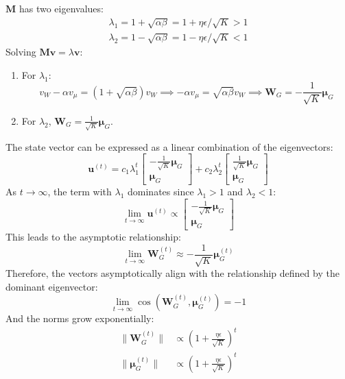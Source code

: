 \documentclass{article}
\theoremstyle{plain}
\theoremstyle{definition}
\theoremstyle{remark}
\begin{document}
$\mathbf{M}$ has two eigenvalues:
\begin{align}
    \lambda_1 = 1 + \sqrt{\alpha \beta} = 1 + \eta \epsilon / \sqrt{K} > 1\\
    \lambda_2 = 1 - \sqrt{\alpha \beta} = 1 - \eta \epsilon / \sqrt{K} < 1
\end{align}
Solving $\mathbf{M} \bm{v} = \lambda \bm{v}$:
\begin{enumerate}
    \item For $\lambda_1$:
    \begin{equation}
        v_W - \alpha v_\mu = (1 + \sqrt{\alpha\beta}) v_W \implies -\alpha v_\mu = \sqrt{\alpha\beta} v_W \implies \bm{W}_G = -\frac{1}{\sqrt{K}} \bm{\mu}_G
    \end{equation}
    \item For $\lambda_2$, $\bm{W}_G = \frac{1}{\sqrt{K}} \bm{\mu}_G$.
\end{enumerate}
The state vector can be expressed as a linear combination of the eigenvectors:
\begin{equation}
    \bm{u}^{(t)} = c_1 \lambda_1^t \begin{bmatrix} -\frac{1}{\sqrt{K}} \bm{\mu}_G \\ \bm{\mu}_G \end{bmatrix} + c_2 \lambda_2^t \begin{bmatrix} \frac{1}{\sqrt{K}} \bm{\mu}_G \\ \bm{\mu}_G \end{bmatrix}
\end{equation}
As $t \to \infty$, the term with $\lambda_1$ dominates since $\lambda_1 > 1$ and $\lambda_2 < 1$:
\begin{equation}
    \lim_{t \to \infty} \bm{u}^{(t)} \propto \begin{bmatrix} -\frac{1}{\sqrt{K}} \bm{\mu}_G \\ \bm{\mu}_G \end{bmatrix}
\end{equation}
This leads to the asymptotic relationship:
\begin{equation}
    \lim_{t \to \infty} \bm{W}_G^{(t)} \approx -\frac{1}{\sqrt{K}} \bm{\mu}_G^{(t)}
\end{equation}
Therefore, the vectors asymptotically align with the relationship defined by the dominant eigenvector:
\begin{equation}
\lim_{t \to \infty} \cos(\bm{W}_G^{(t)}, \bm{\mu}_G^{(t)}) = -1
\end{equation}
And the norms grow exponentially:
\begin{align}
\|\bm{W}_G^{(t)}\| &\propto (1 + \frac{\eta\epsilon}{\sqrt{K}})^t \\
\|\bm{\mu}_G^{(t)}\| &\propto (1 + \frac{\eta\epsilon}{\sqrt{K}})^t
\end{align}
\end{document}
